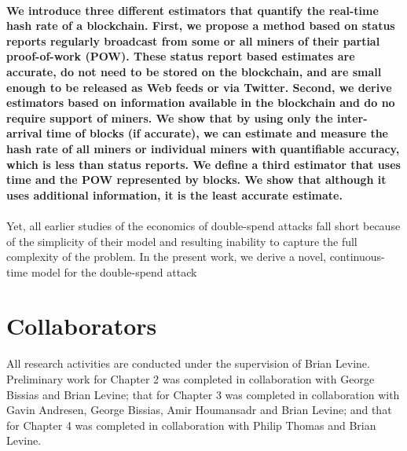 \paragraph*{We introduce three different estimators that quantify the real-time hash rate of a blockchain. First, we propose a method based on status reports regularly broadcast from some or all miners of their partial proof-of-work (POW). These status report based estimates are accurate, do not need to be stored on the blockchain, and are small enough to be released as Web feeds or via Twitter. Second, we derive estimators based on information available in the blockchain and do no require support of miners. We show that by using only the inter-arrival time of blocks (if accurate), we can estimate and measure the hash rate of all miners or individual miners with quantifiable accuracy, which is less than status reports. We define a third estimator that uses time and the POW represented by blocks. We show that although it uses additional information, it is the least accurate estimate.}

\paragraph*{}Yet, all earlier studies of the economics of double-spend attacks fall short because of the simplicity of their model and resulting inability to capture the full complexity of the problem. In the present work, we derive a novel, continuous-time model for the double-spend attack


\section*{Collaborators}
All research activities are conducted under the supervision of Brian Levine. Preliminary work for Chapter 2 was completed in collaboration with George Bissias and Brian Levine; that for Chapter 3 was completed in collaboration with Gavin Andresen, George Bissias, Amir Houmansadr and Brian Levine; and that for Chapter 4 was completed in collaboration with Philip Thomas and Brian Levine.